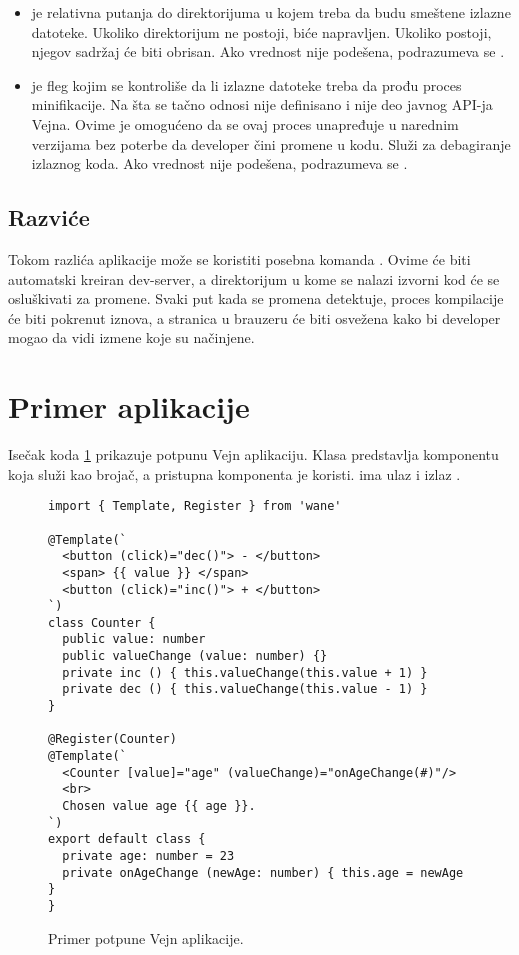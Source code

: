 \begin{itemize}
\item {} je relativna putanja do direktorijuma u kojem treba da budu smeštene izlazne datoteke.
  Ukoliko direktorijum ne postoji, biće napravljen.
  Ukoliko postoji, njegov sadržaj će biti obrisan.
  Ako vrednost nije podešena, podrazumeva se .
\item {} je fleg kojim se kontroliše da li izlazne datoteke treba da prođu proces minifikacije.
  Na šta se tačno odnosi  nije definisano i nije deo javnog API-ja Vejna.
  Ovime je omogućeno da se ovaj proces unapređuje u narednim verzijama bez poterbe da developer čini promene u kodu.
  Služi za debagiranje izlaznog koda.
  Ako vrednost nije podešena, podrazumeva se .
\end{itemize}

\subsection{Razviće}

Tokom razlića aplikacije može se koristiti posebna komanda .
Ovime će biti automatski kreiran dev-server, a  direktorijum u kome se nalazi izvorni kod će se osluškivati za promene.
Svaki put kada se promena detektuje, proces kompilacije će biti pokrenut iznova, a stranica u brauzeru će biti osvežena kako bi developer mogao da vidi izmene koje su načinjene.

\section{Primer aplikacije}

Isečak koda \ref{lst:primer-aplikacije} prikazuje potpunu Vejn aplikaciju.
Klasa  predstavlja komponentu koja služi kao brojač, a pristupna komponenta je koristi.
 ima ulaz  i izlaz .

\begin{figure}
  \begin{lstlisting}
import { Template, Register } from 'wane'

@Template(`
  <button (click)="dec()"> - </button>
  <span> {{ value }} </span>
  <button (click)="inc()"> + </button>
`)
class Counter {
  public value: number
  public valueChange (value: number) {}
  private inc () { this.valueChange(this.value + 1) }
  private dec () { this.valueChange(this.value - 1) }
}

@Register(Counter)
@Template(`
  <Counter [value]="age" (valueChange)="onAgeChange(#)"/>
  <br>
  Chosen value age {{ age }}.
`)
export default class {
  private age: number = 23
  private onAgeChange (newAge: number) { this.age = newAge }
}
  \end{lstlisting}
  \caption{Primer potpune Vejn aplikacije.}
  \label{lst:primer-aplikacije}
\end{figure}

